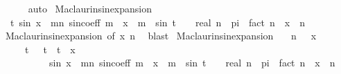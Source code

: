 \begin{isabellebody}
\ \ \ \ \isamarkupfalse%
\isanewline
{}\isamarkupfalse%
\ auto%
\endisatagproof
{\isafoldproof}%
%
\isadelimproof
\isanewline
%
\endisadelimproof
\isanewline
{}\isamarkupfalse%
\ Maclaurin{\isacharunderscore}{\kern0pt}sin{\isacharunderscore}{\kern0pt}expansion{\isacharcolon}{\kern0pt}\isanewline
\ \ {\isachardoublequoteopen}{\isasymexists}t{\isachardot}{\kern0pt}\ sin\ x\ {\isacharequal}{\kern0pt}\ {\isacharparenleft}{\kern0pt}{\isasymSum}m{\isacharless}{\kern0pt}n{\isachardot}{\kern0pt}\ sin{\isacharunderscore}{\kern0pt}coeff\ m\ {\isacharasterisk}{\kern0pt}\ x\ {\isacharcircum}{\kern0pt}\ m{\isacharparenright}{\kern0pt}\ {\isacharplus}{\kern0pt}\ {\isacharparenleft}{\kern0pt}sin\ {\isacharparenleft}{\kern0pt}t\ {\isacharplus}{\kern0pt}\ {}{\isacharslash}{\kern0pt}{}\ {\isacharasterisk}{\kern0pt}\ real\ n\ {\isacharasterisk}{\kern0pt}\ pi{\isacharparenright}{\kern0pt}\ {\isacharslash}{\kern0pt}\ fact\ n{\isacharparenright}{\kern0pt}\ {\isacharasterisk}{\kern0pt}\ x\ {\isacharcircum}{\kern0pt}\ n{\isachardoublequoteclose}\isanewline
%
\isadelimproof
\ \ %
\endisadelimproof
%
\isatagproof
{}\isamarkupfalse%
\ Maclaurin{\isacharunderscore}{\kern0pt}sin{\isacharunderscore}{\kern0pt}expansion{}\ {\isacharbrackleft}{\kern0pt}of\ x\ n{\isacharbrackright}{\kern0pt}\ \isamarkupfalse%
\ blast%
\endisatagproof
{\isafoldproof}%
%
\isadelimproof
\isanewline
%
\endisadelimproof
\isanewline
{}\isamarkupfalse%
\ Maclaurin{\isacharunderscore}{\kern0pt}sin{\isacharunderscore}{\kern0pt}expansion{}{\isacharcolon}{\kern0pt}\isanewline
\ \ \ {\isachardoublequoteopen}n\ {\isachargreater}{\kern0pt}\ {}{\isachardoublequoteclose}\ {\isachardoublequoteopen}x\ {\isachargreater}{\kern0pt}\ {}{\isachardoublequoteclose}\isanewline
\ \ \ \ \ {\isachardoublequoteopen}{\isasymexists}t{\isachardot}{\kern0pt}\ {}\ {\isacharless}{\kern0pt}\ t\ {\isasymand}\ t\ {\isacharless}{\kern0pt}\ x\ {\isasymand}\isanewline
\ \ \ \ \ \ \ \ \ \ sin\ x\ {\isacharequal}{\kern0pt}\ {\isacharparenleft}{\kern0pt}{\isasymSum}m{\isacharless}{\kern0pt}n{\isachardot}{\kern0pt}\ sin{\isacharunderscore}{\kern0pt}coeff\ m\ {\isacharasterisk}{\kern0pt}\ x\ {\isacharcircum}{\kern0pt}\ m{\isacharparenright}{\kern0pt}\ {\isacharplus}{\kern0pt}\ {\isacharparenleft}{\kern0pt}sin\ {\isacharparenleft}{\kern0pt}t\ {\isacharplus}{\kern0pt}\ {}{\isacharslash}{\kern0pt}{}\ {\isacharasterisk}{\kern0pt}\ real\ n\ {\isacharasterisk}{\kern0pt}\ pi{\isacharparenright}{\kern0pt}\ {\isacharslash}{\kern0pt}\ fact\ n{\isacharparenright}{\kern0pt}\ {\isacharasterisk}{\kern0pt}\ x\ {\isacharcircum}{\kern0pt}\ n{\isachardoublequoteclose}\isanewline

\end{isabellebody}
